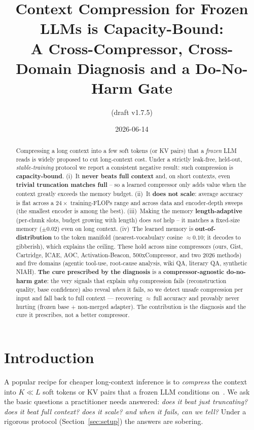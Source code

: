 \documentclass[11pt]{article}
\title{\textbf{Context Compression for Frozen LLMs is Capacity-Bound:}\\
A Cross-Compressor, Cross-Domain Diagnosis and a Do-No-Harm Gate}
\author{(draft v1.7.5)}
\date{2026-06-14}
\begin{document}
\maketitle

\begin{abstract}
Compressing a long context into a few soft tokens (or KV pairs) that a \emph{frozen} LLM reads is widely
proposed to cut long-context cost. Under a strictly leak-free, held-out, \emph{stable-training} protocol we
report a consistent negative result: such compression is \textbf{capacity-bound}. (i)~It \textbf{never beats
full context} and, on short contexts, even \textbf{trivial truncation matches full} -- so a learned compressor
only adds value when the context greatly exceeds the memory budget. (ii)~It \textbf{does not scale}: average
accuracy is flat across a $24\times$ training-FLOPs range and across data and encoder-depth sweeps (the smallest
encoder is among the best). (iii)~Making the memory \textbf{length-adaptive} (per-chunk slots, budget growing
with length) does \emph{not} help -- it matches a fixed-size memory ($\pm0.02$) even on long context. (iv)~The
learned memory is \textbf{out-of-distribution} to the token manifold (nearest-vocabulary cosine $\approx 0.10$;
it decodes to gibberish), which explains the ceiling. These hold across nine compressors (ours, Gist,
Cartridge, ICAE, AOC, Activation-Beacon, 500xCompressor, and two 2026 methods) and five domains (agentic
tool-use, root-cause analysis, wiki QA, literary QA, synthetic NIAH). \textbf{The cure prescribed by the
diagnosis} is a \textbf{compressor-agnostic do-no-harm gate}: the very signals that explain \emph{why}
compression fails (reconstruction quality, base confidence) also reveal \emph{when} it fails, so we detect
unsafe compression per input and fall back to full context --- recovering $\approx$\,full accuracy and provably
never hurting (frozen base + non-merged adapter). The contribution is the diagnosis and the cure it prescribes,
not a better compressor.
\end{abstract}

\section{Introduction}
A popular recipe for cheaper long-context inference is to \emph{compress} the context into $K\!\ll\!L$ soft
tokens or KV pairs that a frozen LLM conditions on~\cite{gist,cartridges,icae}. We ask the basic questions a
practitioner needs answered: \emph{does it beat just truncating? does it beat full context? does it scale? and
when it fails, can we tell?} Under a rigorous protocol (Section~\ref{sec:setup}) the answers are sobering.
\end{document}

